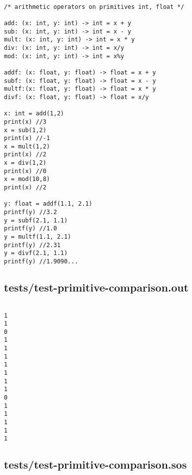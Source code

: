 \documentclass[main.tex]{subfiles}
\begin{document}
\begin{lstlisting}

/* arithmetic operators on primitives int, float */

add: (x: int, y: int) -> int = x + y
sub: (x: int, y: int) -> int = x - y
mult: (x: int, y: int) -> int = x * y
div: (x: int, y: int) -> int = x/y
mod: (x: int, y: int) -> int = x%y

addf: (x: float, y: float) -> float = x + y 
subf: (x: float, y: float) -> float = x - y 
multf:(x: float, y: float) -> float = x * y 
divf: (x: float, y: float) -> float = x/y 

x: int = add(1,2)
print(x) //3
x = sub(1,2)
print(x) //-1
x = mult(1,2)
print(x) //2
x = div(1,2)
print(x) //0
x = mod(10,8)
print(x) //2

y: float = addf(1.1, 2.1)
printf(y) //3.2
y = subf(2.1, 1.1)
printf(y) //1.0
y = multf(1.1, 2.1)
printf(y) //2.31
y = divf(2.1, 1.1)
printf(y) //1.9090...
\end{lstlisting}

\subsection{tests/test-primitive-comparison.out}

\begin{lstlisting}

1
1
0
1
1
1
1
1
1
1
0
1
1
1
1
1
\end{lstlisting}

\subsection{tests/test-primitive-comparison.sos}
\end{document}
